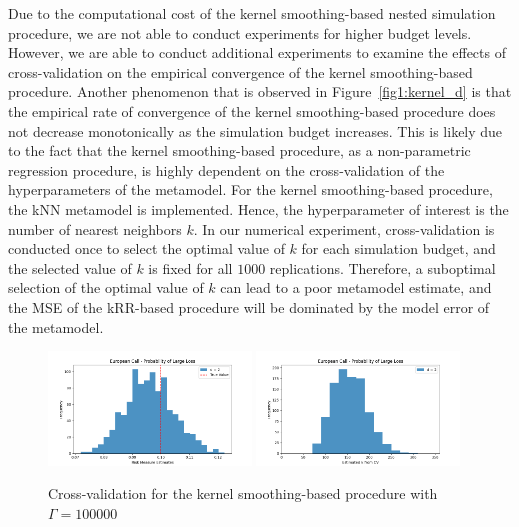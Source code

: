 Due to the computational cost of the kernel smoothing-based nested simulation procedure, we are not able to conduct experiments for higher budget levels.
However, we are able to conduct additional experiments to examine the effects of cross-validation on the empirical convergence of the kernel smoothing-based procedure.
Another phenomenon that is observed in Figure~\ref{fig1:kernel_d} is that the empirical rate of convergence of the kernel smoothing-based procedure does not decrease monotonically as the simulation budget increases.
This is likely due to the fact that the kernel smoothing-based procedure, as a non-parametric regression procedure, is highly dependent on the cross-validation of the hyperparameters of the metamodel.
For the kernel smoothing-based procedure, the kNN metamodel is implemented. 
Hence, the hyperparameter of interest is the number of nearest neighbors $k$.
In our numerical experiment, cross-validation is conducted once to select the optimal value of $k$ for each simulation budget, and the selected value of $k$ is fixed for all $\num{1000}$ replications.
Therefore, a suboptimal selection of the optimal value of $k$ can lead to a poor metamodel estimate, and the MSE of the kRR-based procedure will be dominated by the model error of the metamodel.

\begin{figure}[ht!]
    \centering
    \includegraphics[width=0.48\textwidth]{./project1/figures/figure5a.png}
    \includegraphics[width=0.48\textwidth]{./project1/figures/figure5b.png}
    \caption{Cross-validation for the kernel smoothing-based procedure with $\Gamma=\num{100000}$}
    \label{fig1:kernel_cv} 
\end{figure}

